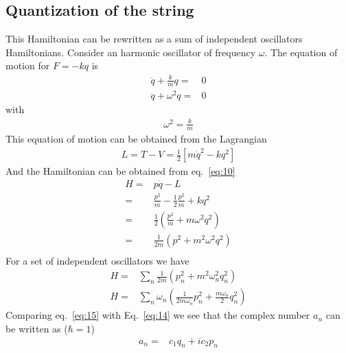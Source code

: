 \subsection{Quantization of the string}
\label{sec:quantization-string}
\begin{frame}

This Hamiltonian can be rewritten as a sum of independent  oscillators Hamiltonians. Consider an harmonic oscillator of frequency $\omega$. The equation of motion for $F=-k q$ is
\begin{align}
  \ddot{q}+\frac{k}{m}q=&0\nonumber\\
   \ddot{q}+\omega^2q=&0
\end{align}
with
\begin{align}
  \omega^2=\frac{k}{m}
\end{align}
This equation of motion can be obtained from the Lagrangian
\begin{align}
  L=T-V=\frac{1}{2}[m\dot{q}^2-k q^2]
\end{align}
And the Hamiltonian can be obtained from eq.~\eqref{eq:10}
\begin{align}
   H=&p \dot{q}-L\nonumber\\
   =&\frac{p^2}{m}-\frac{1}{2}\frac{p^2}{m}+k q^2\nonumber\\
   =&\frac{1}{2}\left(\frac{p^2}{m}+m \omega^2 q^2\right)\nonumber\\
   =&\frac{1}{2m}\left({p^2}+m^2 \omega^2 q^2\right)\nonumber\\
\end{align}
For a set of independent oscillators we have
\begin{align}
\label{eq:15}
  H=&\sum_n\frac{1}{2m}\left({p_n^2}+m^2 \omega_n^2 q_n^2\right)\nonumber\\
  H=&\sum_n{\omega_n}\left(\frac{1}{{2m}\omega_n}p_n^2+\frac{m\omega_n}{2} q_n^2\right)
\end{align}
Comparing eq.~\eqref{eq:15} with Eq.~\eqref{eq:14} we see that the complex number $a_n$ can be written as ($\hbar=1$)
\begin{align}
  a_n=& c_1q_n+i c_2p_n
\end{align}


\end{frame}
